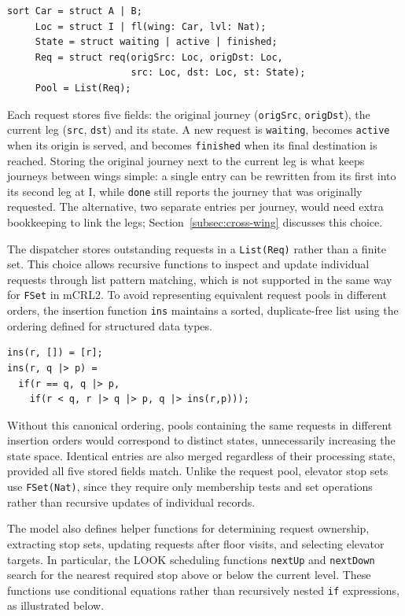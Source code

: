 \begin{lstlisting}
sort Car = struct A | B;
     Loc = struct I | fl(wing: Car, lvl: Nat);
     State = struct waiting | active | finished;
     Req = struct req(origSrc: Loc, origDst: Loc,
                      src: Loc, dst: Loc, st: State);
     Pool = List(Req);
\end{lstlisting}

Each request stores five fields: the original journey (\texttt{origSrc}, \texttt{origDst}), the current leg (\texttt{src}, \texttt{dst}) and its state. A new request is \texttt{waiting}, becomes \texttt{active} when its origin is served, and becomes \texttt{finished} when its final destination is reached. Storing the original journey next to the current leg is what keeps journeys between wings simple: a single entry can be rewritten from its first into its second leg at I, while \texttt{done} still reports the journey that was originally requested. The alternative, two separate entries per journey, would need extra bookkeeping to link the legs; Section~\ref{subsec:cross-wing} discusses this choice.

The dispatcher stores outstanding requests in a \texttt{List(Req)} rather than a finite set. This choice allows recursive functions to inspect and update individual requests through list pattern matching, which is not supported in the same way for \texttt{FSet} in mCRL2. To avoid representing equivalent request pools in different orders, the insertion function \texttt{ins} maintains a sorted, duplicate-free list using the ordering defined for structured data types.

\begin{lstlisting}
ins(r, []) = [r];
ins(r, q |> p) =
  if(r == q, q |> p,
    if(r < q, r |> q |> p, q |> ins(r,p)));
\end{lstlisting}

Without this canonical ordering, pools containing the same requests in different insertion orders would correspond to distinct states, unnecessarily increasing the state space. Identical entries are also merged regardless of their processing state, provided all five stored fields match. Unlike the request pool, elevator stop sets use \texttt{FSet(Nat)}, since they require only membership tests and set operations rather than recursive updates of individual records.

The model also defines helper functions for determining request ownership, extracting stop sets, updating requests after floor visits, and selecting elevator targets. In particular, the LOOK scheduling functions \texttt{nextUp} and \texttt{nextDown} search for the nearest required stop above or below the current level. These functions use conditional equations rather than recursively nested \texttt{if} expressions, as illustrated below.


